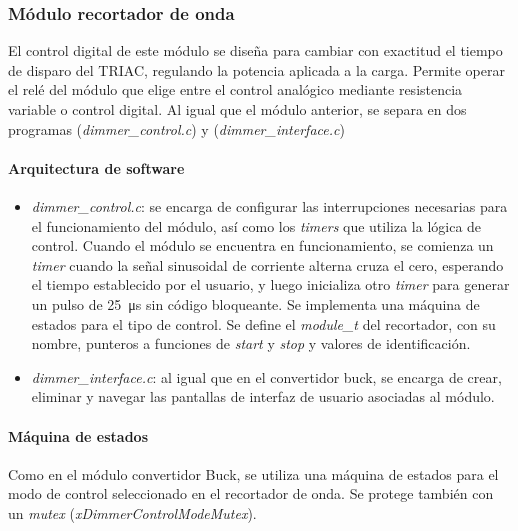 \subsubsection{Módulo recortador de onda}

El control digital de este módulo se diseña para cambiar con exactitud el tiempo de disparo del TRIAC, regulando la potencia aplicada a la carga. Permite operar el relé del módulo que elige entre el control analógico mediante resistencia variable o control digital. Al igual que el módulo anterior, se separa en dos programas (\textit{dimmer\_control.c}) y (\textit{dimmer\_interface.c})

\paragraph{Arquitectura de software}

\begin{itemize}[noitemsep]
    \item \textit{dimmer\_control.c}: se encarga de configurar las interrupciones necesarias para el funcionamiento del módulo, así como los \textit{timers} que utiliza la lógica de control. Cuando el módulo se encuentra en funcionamiento, se comienza un \textit{timer} cuando la señal sinusoidal de corriente alterna cruza el cero, esperando el tiempo establecido por el usuario, y luego inicializa otro \textit{timer} para generar un pulso de \SI{25}{\micro\second} sin código bloqueante. Se implementa una máquina de estados para el tipo de control. Se define el \textit{module\_t} del recortador, con su nombre, punteros a funciones de \textit{start} y \textit{stop} y valores de identificación.
    \item \textit{dimmer\_interface.c}: al igual que en el convertidor buck, se encarga de crear, eliminar y navegar las pantallas de interfaz de usuario asociadas al módulo.
\end{itemize}

\paragraph{Máquina de estados}

Como en el módulo convertidor Buck, se utiliza una máquina de estados para el modo de control seleccionado en el recortador de onda. Se protege también con un \textit{mutex} (\textit{xDimmerControlModeMutex}).

